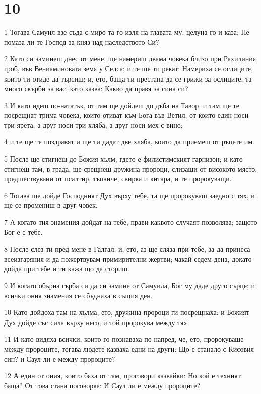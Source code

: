 \chapter{10}

\par 1 Тогава Самуил взе съда с миро та го изля на главата му, целуна го и каза: Не помаза ли те Господ за княз над наследството Си?
\par 2 Като си заминеш днес от мене, ще намериш двама човека близо при Рахилиния гроб, във Вениаминовата земя у Селса; и те ще ти рекат: Намериха се ослиците, които ти отиде да търсиш; и, ето, баща ти престана да се грижи за ослиците, та много скърби за вас, като казва: Какво да правя за сина си?
\par 3 И като идеш по-нататък, от там ще дойдеш до дъба на Тавор, и там ще те посрещнат трима човека, които отиват към Бога във Ветил, от които един носи три ярета, а друг носи три хляба, а друг носи мех с вино;
\par 4 и те ще те поздравят и ще ти дадат две хляба, които да приемеш от ръцете им.
\par 5 После ще стигнеш до Божия хълм, гдето е филистимският гарнизон; и като стигнеш там, в града, ще срещнеш дружина пророци, слизащи от високото място, предшествувани от псалтир, тъпанче, свирка и китара, и те пророкуващи.
\par 6 Тогава ще дойде Господният Дух върху тебе, та ще пророкуваш заедно с тях, и ще се промениш в друг човек.
\par 7 А когато тия знамения дойдат на тебе, прави каквото случаят позволява; защото Бог е с тебе.
\par 8 После слез ти пред мене в Галгал; и, ето, аз ще сляза при тебе, за да принеса всеизгаряния и да пожертвувам примирителни жертви; чакай седем дена, докато дойда при тебе и ти кажа що да сториш.
\par 9 И когато обърна гърба си да си замине от Самуила, Бог му даде друго сърце; и всички ония знамения се сбъднаха в същия ден.
\par 10 Като дойдоха там на хълма, ето, дружина пророци ги посрещнаха: и Божият Дух дойде със сила върху него, и той пророкува между тях.
\par 11 И като видяха всички, които го познаваха по-напред, че, ето, пророкуваше между пророците, тогава людете казваха едни на други: Що е станало с Кисовия син? и Саул ли е между пророците?
\par 12 А един от ония, които бяха от там, проговори казвайки: Но кой е техният баща? От това стана поговорка: И Саул ли е между пророците?
